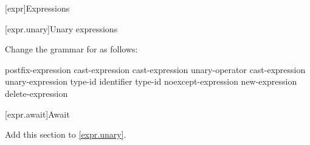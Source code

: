 

\setcounter{chapter}{4}
[expr]{Expressions}

\setcounter{section}{2}
[expr.unary]{Unary expressions}


Change the grammar for  as follows:

\begin{bnf}
	\br
	postfix-expression\br
	\terminal{++} cast-expression\br
	\terminal{-{-}} cast-expression\br
	\br
	unary-operator cast-expression\br
	 unary-expression\br
	 type-id \terminal{)}\br
	 \terminal{(} identifier \terminal{)}\br
	 type-id \terminal{)}\br
	noexcept-expression\br
	new-expression\br
	delete-expression\br
\end{bnf}

%
%
%

\setcounter{subsection}{7}
[expr.await]{Await}

Add this section to \ref{expr.unary}.

